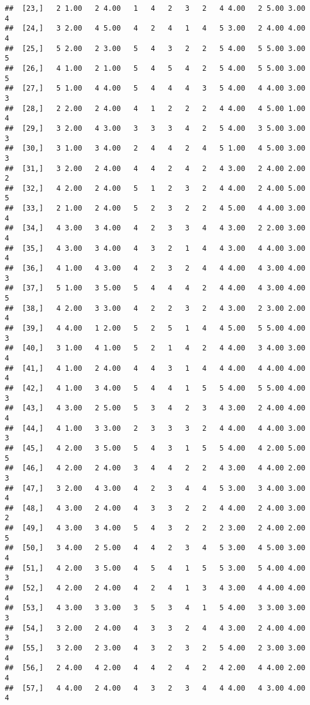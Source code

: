 \documentclass[]{article}
\begin{document}
\begin{verbatim}
##  [23,]   2 1.00   2 4.00   1   4   2   3   2   4 4.00   2 5.00 3.00   4
##  [24,]   3 2.00   4 5.00   4   2   4   1   4   5 3.00   2 4.00 4.00   4
##  [25,]   5 2.00   2 3.00   5   4   3   2   2   5 4.00   5 5.00 3.00   5
##  [26,]   4 1.00   2 1.00   5   4   5   4   2   5 4.00   5 5.00 3.00   5
##  [27,]   5 1.00   4 4.00   5   4   4   4   3   5 4.00   4 4.00 3.00   3
##  [28,]   2 2.00   2 4.00   4   1   2   2   2   4 4.00   4 5.00 1.00   4
##  [29,]   3 2.00   4 3.00   3   3   3   4   2   5 4.00   3 5.00 3.00   3
##  [30,]   3 1.00   3 4.00   2   4   4   2   4   5 1.00   4 5.00 3.00   3
##  [31,]   3 2.00   2 4.00   4   4   2   4   2   4 3.00   2 4.00 2.00   2
##  [32,]   4 2.00   2 4.00   5   1   2   3   2   4 4.00   2 4.00 5.00   5
##  [33,]   2 1.00   2 4.00   5   2   3   2   2   4 5.00   4 4.00 3.00   4
##  [34,]   4 3.00   3 4.00   4   2   3   3   4   4 3.00   2 2.00 3.00   4
##  [35,]   4 3.00   3 4.00   4   3   2   1   4   4 3.00   4 4.00 3.00   4
##  [36,]   4 1.00   4 3.00   4   2   3   2   4   4 4.00   4 3.00 4.00   3
##  [37,]   5 1.00   3 5.00   5   4   4   4   2   4 4.00   4 3.00 4.00   5
##  [38,]   4 2.00   3 3.00   4   2   2   3   2   4 3.00   2 3.00 2.00   4
##  [39,]   4 4.00   1 2.00   5   2   5   1   4   4 5.00   5 5.00 4.00   3
##  [40,]   3 1.00   4 1.00   5   2   1   4   2   4 4.00   3 4.00 3.00   4
##  [41,]   4 1.00   2 4.00   4   4   3   1   4   4 4.00   4 4.00 4.00   4
##  [42,]   4 1.00   3 4.00   5   4   4   1   5   5 4.00   5 5.00 4.00   3
##  [43,]   4 3.00   2 5.00   5   3   4   2   3   4 3.00   2 4.00 4.00   4
##  [44,]   4 1.00   3 3.00   2   3   3   3   2   4 4.00   4 4.00 3.00   3
##  [45,]   4 2.00   3 5.00   5   4   3   1   5   5 4.00   4 2.00 5.00   5
##  [46,]   4 2.00   2 4.00   3   4   4   2   2   4 3.00   4 4.00 2.00   3
##  [47,]   3 2.00   4 3.00   4   2   3   4   4   5 3.00   3 4.00 3.00   4
##  [48,]   4 3.00   2 4.00   4   3   3   2   2   4 4.00   2 4.00 3.00   2
##  [49,]   4 3.00   3 4.00   5   4   3   2   2   2 3.00   2 4.00 2.00   5
##  [50,]   3 4.00   2 5.00   4   4   2   3   4   5 3.00   4 5.00 3.00   4
##  [51,]   4 2.00   3 5.00   4   5   4   1   5   5 3.00   5 4.00 4.00   3
##  [52,]   4 2.00   2 4.00   4   2   4   1   3   4 3.00   4 4.00 4.00   4
##  [53,]   4 3.00   3 3.00   3   5   3   4   1   5 4.00   3 3.00 3.00   3
##  [54,]   3 2.00   2 4.00   4   3   3   2   4   4 3.00   2 4.00 4.00   3
##  [55,]   3 2.00   2 3.00   4   3   2   3   2   5 4.00   2 3.00 3.00   4
##  [56,]   2 4.00   4 2.00   4   4   2   4   2   4 2.00   4 4.00 2.00   4
##  [57,]   4 4.00   2 4.00   4   3   2   3   4   4 4.00   4 3.00 4.00   4

\end{verbatim}
\end{document}
